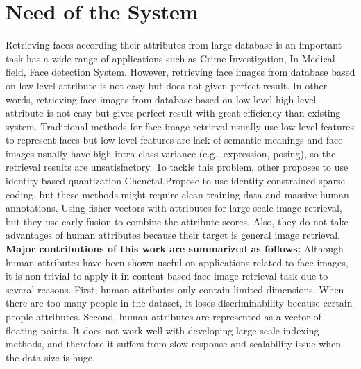 \section{\normalsize{\textbf{Need of the System}}}
Retrieving faces according their attributes from large database is an important task has a wide range of applications such as Crime Investigation, In Medical field, Face detection System. However, retrieving face images from database based on low level attribute is not easy but does not given perfect result. In other words, retrieving face images from database based on low level high level attribute is not easy but gives perfect result with great efficiency than existing system. Traditional methods for face image retrieval usually use low level features to represent faces but low-level features are lack of semantic meanings and face images usually have high intra-class variance (e.g., expression, posing), so the retrieval results are unsatisfactory. To tackle this problem, other proposes to use identity based quantization Chenetal.Propose to use identity-constrained sparse coding, but these methods might require clean training data and massive human annotations. Using fisher vectors with attributes for large-scale image retrieval, but they use early fusion to combine the attribute scores. Also, they do not take advantages of human attributes because their target is general image retrieval.
\newline \textbf{Major contributions of this work are summarized as follows:} 
Although human attributes have been shown useful on applications related to face images, it is non-trivial to apply it in content-based face image retrieval task due to several reasons. First, human attributes only contain limited dimensions. When there are too many people in the dataset, it loses discriminability because certain people attributes. Second, human attributes are represented as a vector of floating points. It does not work well with developing large-scale indexing methods, and therefore it suffers from slow response and scalability issue when the data size is huge.
 

